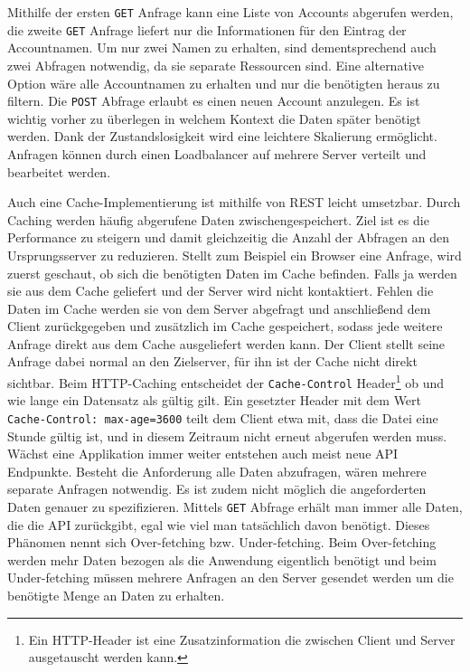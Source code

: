 Mithilfe der ersten \verb+GET+ Anfrage kann eine Liste von Accounts abgerufen werden, die zweite \verb+GET+ Anfrage liefert nur die Informationen für den Eintrag \grqq{}  der Accountnamen.
Um nur zwei Namen zu erhalten, sind dementsprechend auch zwei Abfragen notwendig, da sie separate Ressourcen sind.
Eine alternative Option wäre alle Accountnamen zu erhalten und nur die benötigten heraus zu filtern.
Die \verb+POST+ Abfrage erlaubt es einen neuen Account anzulegen.
Es ist wichtig vorher zu überlegen in welchem Kontext die Daten später benötigt werden.
Dank der Zustandslosigkeit wird eine leichtere Skalierung ermöglicht.
Anfragen können durch einen Loadbalancer auf mehrere Server verteilt und bearbeitet werden.

Auch eine Cache-Implementierung ist mithilfe von REST leicht umsetzbar.
Durch Caching werden häufig abgerufene Daten zwischengespeichert.
Ziel ist es die Performance zu steigern und damit gleichzeitig die Anzahl der Abfragen an den Ursprungsserver zu reduzieren.
Stellt zum Beispiel ein Browser eine Anfrage, wird zuerst geschaut, ob sich die benötigten Daten im Cache befinden.
Falls ja werden sie aus dem Cache geliefert und der Server wird nicht kontaktiert.
Fehlen die Daten im Cache werden sie von dem Server abgefragt und anschließend dem Client zurückgegeben und zusätzlich im Cache gespeichert, sodass jede weitere Anfrage direkt aus dem Cache ausgeliefert werden kann.
Der Client stellt seine Anfrage dabei normal an den Zielserver, für ihn ist der Cache nicht direkt sichtbar.
Beim HTTP-Caching entscheidet der \verb+Cache-Control+ Header\footnote{Ein HTTP-Header ist eine Zusatzinformation die zwischen Client und Server ausgetauscht werden kann.} ob und wie lange ein Datensatz als gültig gilt.
Ein gesetzter Header mit dem Wert \verb+Cache-Control: max-age=3600+ teilt dem Client etwa mit, dass die Datei eine Stunde gültig ist, und in diesem Zeitraum nicht erneut abgerufen werden muss. \cite[Seite 21]{Cache}
\clearpage
Wächst eine Applikation immer weiter entstehen auch meist neue API Endpunkte.
Besteht die Anforderung alle Daten abzufragen, wären mehrere separate Anfragen notwendig.
Es ist zudem nicht möglich die angeforderten Daten genauer zu spezifizieren.
Mittels \verb+GET+ Abfrage erhält man immer alle Daten, die die API zurückgibt, egal wie viel man tatsächlich davon benötigt.
Dieses Phänomen nennt sich Over-fetching bzw. Under-fetching.
Beim Over-fetching werden mehr Daten bezogen als die Anwendung eigentlich benötigt und beim Under-fetching müssen mehrere Anfragen an den Server gesendet werden um die benötigte Menge an Daten zu erhalten.\cite{API}

